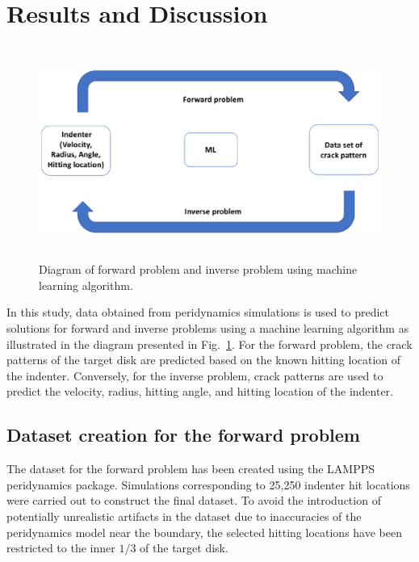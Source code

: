 \section{Results and Discussion}
\label{sec:4}


\begin{figure}
  \includegraphics[width=12cm, height=7cm]{figure/diagram.eps}

\caption{Diagram of forward problem and inverse problem using machine learning algorithm.}
\label{fig:3}       
\end{figure}

In this study, data obtained from peridynamics simulations is used to predict solutions for forward and inverse problems using a machine learning algorithm as illustrated in the diagram presented in Fig.~\ref{fig:3}.
For the forward problem, the crack patterns of the target disk are predicted based on the known hitting location of the indenter.
Conversely, for the inverse problem, crack patterns are used to predict the velocity, radius, hitting angle, and hitting location of the indenter.

\subsection{Dataset creation for the forward problem}
\label{forward_data}

The dataset for the forward problem has been created using the LAMPPS peridynamics package.  Simulations corresponding to  25,250 indenter hit locations were carried out to construct the final dataset.  To avoid the introduction of potentially unrealistic artifacts in the dataset due to inaccuracies of the peridynamics model near the boundary, the selected hitting locations have been restricted to the inner $1/3$ of the target disk.

